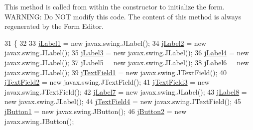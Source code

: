 This method is called from within the constructor to initialize the form. W\+A\+R\+N\+I\+NG\+: Do N\+OT modify this code. The content of this method is always regenerated by the Form Editor. 
\begin{DoxyCode}
31                                   \{
32 
33         \mbox{\hyperlink{class_interfaz_package_1_1_verificar_lector_a94dfc256ea6a29f49c233c3fec52ac7d}{jLabel1}} = \textcolor{keyword}{new} javax.swing.JLabel();
34         \mbox{\hyperlink{class_interfaz_package_1_1_verificar_lector_afe825b210747901c7fe1977911da0ae4}{jLabel2}} = \textcolor{keyword}{new} javax.swing.JLabel();
35         \mbox{\hyperlink{class_interfaz_package_1_1_verificar_lector_ad3a983dda4f171c69b407375acaf226d}{jLabel3}} = \textcolor{keyword}{new} javax.swing.JLabel();
36         \mbox{\hyperlink{class_interfaz_package_1_1_verificar_lector_a62bbde18899ef9256baedfe4b9356420}{jLabel4}} = \textcolor{keyword}{new} javax.swing.JLabel();
37         \mbox{\hyperlink{class_interfaz_package_1_1_verificar_lector_a1023d3021f65695047c7e5bc41613e09}{jLabel5}} = \textcolor{keyword}{new} javax.swing.JLabel();
38         \mbox{\hyperlink{class_interfaz_package_1_1_verificar_lector_a6f0c74ae426505ab6ed81776821a97ee}{jLabel6}} = \textcolor{keyword}{new} javax.swing.JLabel();
39         \mbox{\hyperlink{class_interfaz_package_1_1_verificar_lector_a7c056e1870eb31ca108b4da56a7d93f4}{jTextField1}} = \textcolor{keyword}{new} javax.swing.JTextField();
40         \mbox{\hyperlink{class_interfaz_package_1_1_verificar_lector_a3f80f83121eebb36d3c494a791ae2e00}{jTextField2}} = \textcolor{keyword}{new} javax.swing.JTextField();
41         \mbox{\hyperlink{class_interfaz_package_1_1_verificar_lector_a0fb6ae08627a62444fca7c09e992446d}{jTextField3}} = \textcolor{keyword}{new} javax.swing.JTextField();
42         \mbox{\hyperlink{class_interfaz_package_1_1_verificar_lector_abffae3dbc14e8cf54a27d75cbd7cb040}{jLabel7}} = \textcolor{keyword}{new} javax.swing.JLabel();
43         \mbox{\hyperlink{class_interfaz_package_1_1_verificar_lector_a52d146b88c9bbed0098e87f7e4f3a759}{jLabel8}} = \textcolor{keyword}{new} javax.swing.JLabel();
44         \mbox{\hyperlink{class_interfaz_package_1_1_verificar_lector_a782676dc9af3fa99d3a06020501824f7}{jTextField4}} = \textcolor{keyword}{new} javax.swing.JTextField();
45         \mbox{\hyperlink{class_interfaz_package_1_1_verificar_lector_a104af7dfee375e893832d6c38d12a1dd}{jButton1}} = \textcolor{keyword}{new} javax.swing.JButton();
46         \mbox{\hyperlink{class_interfaz_package_1_1_verificar_lector_a05b1ef2e05306def8a78c0e4ee0802fb}{jButton2}} = \textcolor{keyword}{new} javax.swing.JButton();

\end{DoxyCode}
